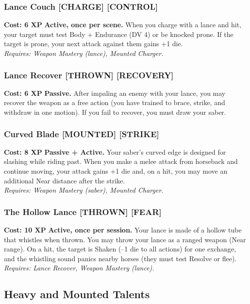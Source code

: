 \documentclass[12pt,a4paper]{book}
\begin{document}
\subsubsection*{Lance Couch \textnormal{[CHARGE] [CONTROL]}}
\label{talent:lance-couch}
\textbf{Cost: 6 XP} \textbf{Active, once per scene.} When you charge with a lance and hit, your target must test Body + Endurance (DV 4) or be knocked prone. If the target is prone, your next attack against them gains +1 die. \\
\textit{Requires: Weapon Mastery (lance), Mounted Charger.}

\subsubsection*{Lance Recover \textnormal{[THROWN] [RECOVERY]}}
\label{talent:lance-recover}
\textbf{Cost: 6 XP} \textbf{Passive.} After impaling an enemy with your lance, you may recover the weapon as a free action (you have trained to brace, strike, and withdraw in one motion). If you fail to recover, you must draw your saber.

\subsubsection*{Curved Blade \textnormal{[MOUNTED] [STRIKE]}}
\label{talent:curved-blade}
\textbf{Cost: 8 XP} \textbf{Passive + Active.} Your saber's curved edge is designed for slashing while riding past. When you make a melee attack from horseback and continue moving, your attack gains +1 die and, on a hit, you may move an additional Near distance after the strike. \\
\textit{Requires: Weapon Mastery (saber), Mounted Charger.}

\subsubsection*{The Hollow Lance \textnormal{[THROWN] [FEAR]}}
\label{talent:hollow-lance}
\textbf{Cost: 10 XP} \textbf{Active, once per session.} Your lance is made of a hollow tube that whistles when thrown. You may throw your lance as a ranged weapon (Near range). On a hit, the target is Shaken (--1 die to all actions) for one exchange, and the whistling sound panics nearby horses (they must test Resolve or flee). \\
\textit{Requires: Lance Recover, Weapon Mastery (lance).}

\subsection*{Heavy and Mounted Talents}
\label{sec:major-heavy}
\end{document}
